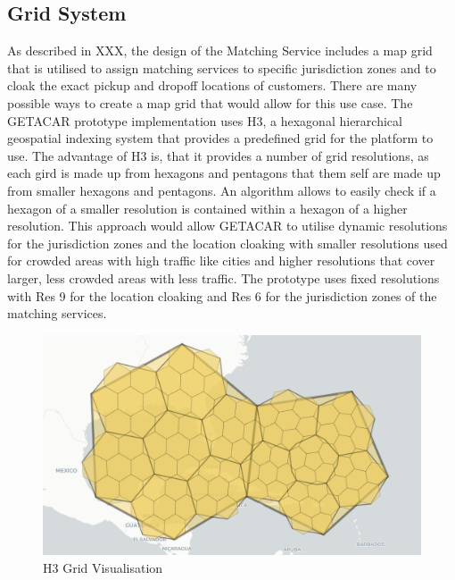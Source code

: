 \subsection{Grid System}
As described in XXX, the design of the Matching Service includes a map grid that is utilised to assign matching services to specific jurisdiction zones and to cloak the exact pickup and dropoff locations of customers. There are many possible ways to create a map grid that would allow for this use case. The GETACAR prototype implementation uses H3, a hexagonal hierarchical geospatial indexing system that provides a predefined grid for the platform to use. The advantage of H3 is, that it provides a number of grid resolutions, as each gird is made up from hexagons and pentagons that them self are made up from smaller hexagons and pentagons. An algorithm allows to easily check if a hexagon of a smaller resolution is contained within a hexagon of a higher resolution. This approach would allow GETACAR to utilise dynamic resolutions for the  jurisdiction zones and the location cloaking with smaller resolutions used for crowded areas with high traffic like cities and higher resolutions that cover larger, less crowded  areas with less traffic. The prototype uses fixed resolutions with Res 9 for the location cloaking and Res 6 for the  jurisdiction zones of the matching services. 

\begin{figure}[h]
    \centering
    \includegraphics[width=\linewidth]{data/11.png}
    \caption{H3 Grid Visualisation}
    \label{fig:H3Visualisation}
\end{figure}

